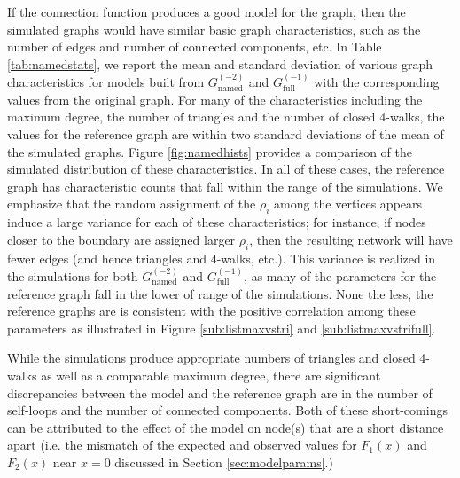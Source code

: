 \documentclass[11]{article}
\newcommand{\namedtwo}{G_{\textrm{named}}^{(-2)}}
\newcommand{\fullone}{G_{\textrm{full}}^{(-1)}}
\theoremstyle{remark}
\theoremstyle{definition}
\begin{document}
If the connection function produces a good model for the graph, then the simulated graphs would have similar basic graph characteristics, such as the number of edges and number of connected components, etc. In Table \ref{tab:namedstats}, we report the mean and standard deviation of various graph characteristics for models built from $\namedtwo$ and $\fullone$ with the corresponding values from the original graph. For many of the characteristics including the maximum degree, the number of triangles and the number of closed 4-walks, the values for the reference graph are within two standard deviations of the mean of the simulated graphs. Figure \ref{fig:namedhists} provides a comparison of the simulated distribution of these characteristics. In all of these cases, the reference graph has characteristic counts that fall within the range of the simulations. We emphasize that the random assignment of the $\rho_i$ among the vertices appears induce a large variance for each of these characteristics; for instance, if nodes closer to the boundary are assigned larger $\rho_i$, then the resulting network will have fewer edges (and hence triangles and 4-walks, etc.). This variance is realized in the simulations for both $\namedtwo$ and $\fullone$, as many of the parameters for the reference graph fall in the lower of range of the simulations. None the less, the reference graphs are is consistent with the positive correlation among these parameters as illustrated in Figure \ref{sub:listmaxvstri} and \ref{sub:listmaxvstrifull}.

While the simulations produce appropriate numbers of triangles and closed 4-walks as well as a comparable maximum degree, there are significant discrepancies between the model and the reference graph are in the number of  self-loops and the number of connected components. Both of these short-comings can be attributed to the effect of the model on node(s) that are a short distance apart (i.e. the mismatch of the expected and observed values for $F_1(x)$ and $F_2(x)$ near $x = 0$ discussed in Section \ref{sec:modelparams}.) 
\end{document}
